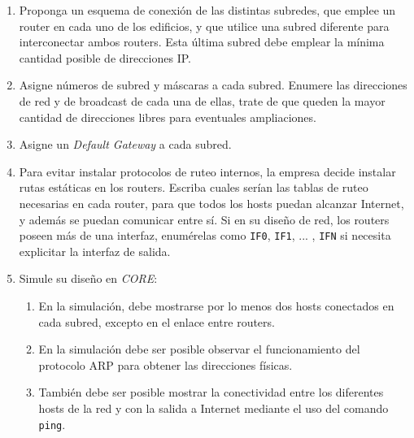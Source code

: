 \begin{enumerate}
    \item Proponga un esquema de conexión de las distintas subredes, que emplee un router en cada uno de los edificios, y que utilice una subred diferente para interconectar ambos routers. Esta última subred debe emplear la mínima cantidad posible de direcciones IP.
    \item Asigne números de subred y máscaras a cada subred. Enumere las direcciones de red y de broadcast de cada una de ellas, trate de que queden la mayor cantidad de direcciones libres para eventuales ampliaciones. 
    \item Asigne un \textit{Default Gateway} a cada subred.
    \item Para evitar instalar protocolos de ruteo internos, la empresa decide instalar rutas estáticas en los routers. Escriba cuales serían las tablas de ruteo necesarias en cada router, para que todos los hosts puedan alcanzar Internet, y además se puedan comunicar entre sí.  Si en su diseño de red, los routers poseen más de una interfaz, enumérelas como \texttt{IF0}, \texttt{IF1}, ... , \texttt{IFN} si necesita explicitar la interfaz de salida.
    \item Simule su diseño en \textit{CORE}:
    \begin{enumerate}
        \item En la simulación, debe mostrarse por lo menos dos hosts conectados en cada subred, excepto en el enlace entre routers.
        \item En la simulación debe ser posible  observar el funcionamiento del protocolo ARP para obtener las direcciones físicas.
        \item También debe ser posible mostrar la conectividad entre los diferentes hosts de  la red y con la salida a Internet mediante el uso del comando \texttt{ping}.
    \end{enumerate}
\end{enumerate}
